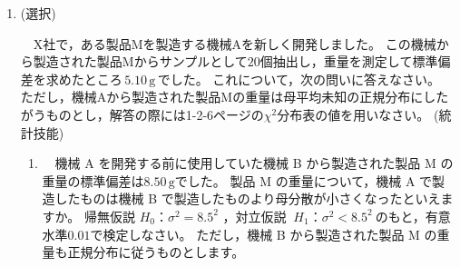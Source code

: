 \documentclass[dvipdfmx, 11pt]{jsarticle}
\newcommand{\A}[0]{\mathrm{A}}
\renewcommand{\(}[0]{\left(}
\renewcommand{\)}[0]{\right)}
\renewcommand{\[}[0]{\left[}
\renewcommand{\]}[0]{\right]}
\renewcommand{\labelenumii}{(\arabic{enumii})}
\begin{document}
\begin{enumerate}
	これについて，次の問いに答えなさい。
	
	\begin{enumerate}
		\item
		　$n$次元空間内に相異なる$(n + 1)$個の点$\A_0$，$\A_1$，…，$\A_n$をとります。
		そのうちの$n$点$\A_1$，$\A_2$，…，$\A_n$の重心をGとするとき
		\begin{equation*}
			{\A_0 \A_1}^2 + {\A_0 \A_2}^2 + … + {\A_0 \A_n}^2 - n \cdot \A_0 \mathrm{G}^2
				= \frac{1}{n} \sum_{1 \leqq i < j \leqq n} {\A_i \A_j}^2
		\end{equation*}
		が成り立つことを証明しなさい。\hspace{\fill} (証明技能) \\
		
		\item 
		　$n$次元空間内にあって互いの距離がすべて等しいような$(n + 1)$個の点のなす図形(それらの凸包)を$n$次元の正単体といい，
		そのときの$(n + 1)$個の点の重心を正単体の重心と定めます。
		
		　1辺の長さが1の$\! n \!$次元正単体について，重心から各頂点までの距離$\ell$を求めなさい。
	\end{enumerate}
	
	\newpage
	

	\item \quad (選択)
	
	　X社で，ある製品Mを製造する機械Aを新しく開発しました。
	この機械から製造された製品Mからサンプルとして$20$個抽出し，重量を測定して標準偏差を求めたところ$\, 5.10 \, \mathrm{g} \,$でした。
	これについて，次の問いに答えなさい。
	ただし，機械Aから製造された製品Mの重量は母平均未知の正規分布にしたがうものとし，解答の際には1-2-6ページの$\chi^2$分布表の値を用いなさい。
	\hspace{\fill} (統計技能)
	
	\begin{enumerate}
		\item 
		　機械\! A \!を開発する前に使用していた機械\! B \!から製造された製品\! M \!の重量の標準偏差は$8.50\, \mathrm{g}$でした。
		製品\! M \!の重量について，機械\! A \!で製造したものは機械\! B \!で製造したものより母分散が小さくなったといえますか。
		帰無仮説 $ H_0$：$\sigma^2 = 8.5^2 $ ，対立仮説 $\ H_1 $：$\sigma^2 < 8.5^2 \ $のもと，有意水準$0.01$で検定しなさい。
		ただし，機械\! B \!から製造された製品\! M \!の重量も正規分布に従うものとします。\\
		

\end{enumerate}
\end{enumerate}
\end{document}

